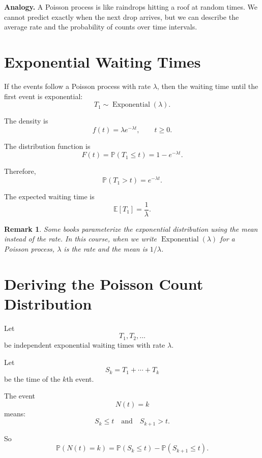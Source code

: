 \documentclass[12pt,a4paper]{article}
\theoremstyle{lecturestyle}
\newtheorem{remark}{Remark}
\newcommand{\Prob}{\mathbb{P}}
\newcommand{\E}{\mathbb{E}}
\begin{document}
\begin{center}
\end{center}

\textbf{Analogy.} A Poisson process is like raindrops hitting a roof at random times. We cannot predict exactly when the next drop arrives, but we can describe the average rate and the probability of counts over time intervals.

\section{Exponential Waiting Times}

If the events follow a Poisson process with rate $\lambda$, then the waiting time until the first event is exponential:
\[
T_1\sim \operatorname{Exponential}(\lambda).
\]

The density is
\[
f(t)=\lambda e^{-\lambda t},
\qquad t\geq 0.
\]

The distribution function is
\[
F(t)=\Prob(T_1\leq t)=1-e^{-\lambda t}.
\]

Therefore,
\[
\Prob(T_1>t)=e^{-\lambda t}.
\]

The expected waiting time is
\[
\E[T_1]=\frac1{\lambda}.
\]

\begin{remark}
Some books parameterize the exponential distribution using the mean instead of the rate. In this course, when we write $\operatorname{Exponential}(\lambda)$ for a Poisson process, $\lambda$ is the rate and the mean is $1/\lambda$.
\end{remark}

\section{Deriving the Poisson Count Distribution}

Let
\[
T_1,T_2,\ldots
\]
be independent exponential waiting times with rate $\lambda$.

Let
\[
S_k=T_1+\cdots+T_k
\]
be the time of the $k$th event.

The event
\[
N(t)=k
\]
means:
\[
S_k\leq t
\quad\text{and}\quad
S_{k+1}>t.
\]

So
\[
\Prob(N(t)=k)
=
\Prob(S_k\leq t)-\Prob(S_{k+1}\leq t).
\]
\end{document}

